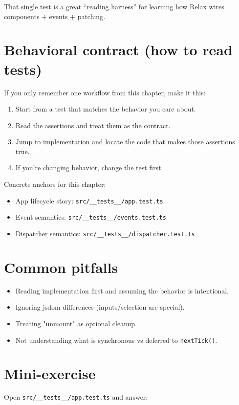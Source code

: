 That single test is a great ``reading harness'' for learning how Relax wires components + events + patching.

\section{Behavioral contract (how to read tests)}
If you only remember one workflow from this chapter, make it this:

\begin{enumerate}
  \item Start from a test that matches the behavior you care about.
  \item Read the assertions and treat them as the contract.
  \item Jump to implementation and locate the code that makes those assertions true.
  \item If you're changing behavior, change the test first.
\end{enumerate}

Concrete anchors for this chapter:

\begin{itemize}
  \item App lifecycle story: \texttt{src/\_\_tests\_\_/app.test.ts}
  \item Event semantics: \texttt{src/\_\_tests\_\_/events.test.ts}
  \item Dispatcher semantics: \texttt{src/\_\_tests\_\_/dispatcher.test.ts}
\end{itemize}

\section{Common pitfalls}
\begin{itemize}
  \item Reading implementation first and assuming the behavior is intentional.
  \item Ignoring jsdom differences (inputs/selection are special).
  \item Treating "unmount" as optional cleanup.
  \item Not understanding what is synchronous vs deferred to \texttt{nextTick()}.
\end{itemize}

\section{Mini-exercise}
Open \texttt{src/\_\_tests\_\_/app.test.ts} and answer:

